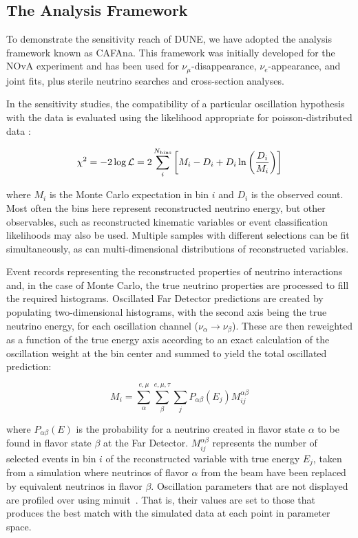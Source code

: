 \subsection{The Analysis Framework}
\label{sect:methods-cafana}

To demonstrate the sensitivity reach of DUNE, we have adopted the analysis framework known as CAFAna. This framework was initially developed for the NOvA experiment and has been used for $\nu_\mu$-disappearance, $\nu_e$-appearance, and joint fits, plus sterile neutrino searches and cross-section analyses.

In the sensitivity studies, the compatibility of a particular oscillation hypothesis with the data is evaluated using the likelihood appropriate for poisson-distributed data \cite{PDG}:

\begin{equation}
    \chi^2 = -2\log\mathcal{L} = 2\sum_i^{N_{\rm bins}}\left[ M_i-D_i+D_i\ln\left({D_i\over M_i}\right) \right]
\end{equation}

where $M_i$ is the Monte Carlo expectation in bin $i$ and $D_i$ is the observed count. Most often the bins here represent reconstructed neutrino energy, but other observables, such as reconstructed kinematic variables or event classification likelihoods may also be used. Multiple samples with different selections can be fit simultaneously, as can multi-dimensional distributions of reconstructed variables.

Event records representing the reconstructed properties of neutrino interactions and, in the case of Monte Carlo, the true neutrino properties are processed to fill the required histograms. Oscillated Far Detector predictions are created by populating two-dimensional histograms, with the second axis being the true neutrino energy, for each oscillation channel ($\nu_\alpha\to\nu_\beta$). These are then reweighted as a function of the true energy axis according to an exact calculation of the oscillation weight at the bin center %
and summed to yield the total oscillated prediction:

\begin{equation}
    M_i = \sum_\alpha^{e,\mu}\sum_\beta^{e,\mu,\tau}\sum_j P_{\alpha\beta}(E_j)M_{ij}^{\alpha\beta}
    \label{eqn:cafana_ll}
\end{equation}

where $P_{\alpha\beta}(E)$ is the probability for a neutrino created in flavor state $\alpha$ to be found in flavor state $\beta$ at the Far Detector. $M_{ij}^{\alpha\beta}$ represents the number of selected events in bin $i$ of the reconstructed variable with true energy $E_j$, taken from a simulation where neutrinos of flavor $\alpha$ from the beam have been replaced by equivalent neutrinos in flavor $\beta$. Oscillation parameters that are not displayed are profiled over using {\sc minuit}~\cite{James:1994vla}. That is, their values are set to those that produces the best match with the simulated data at each point in parameter space.

